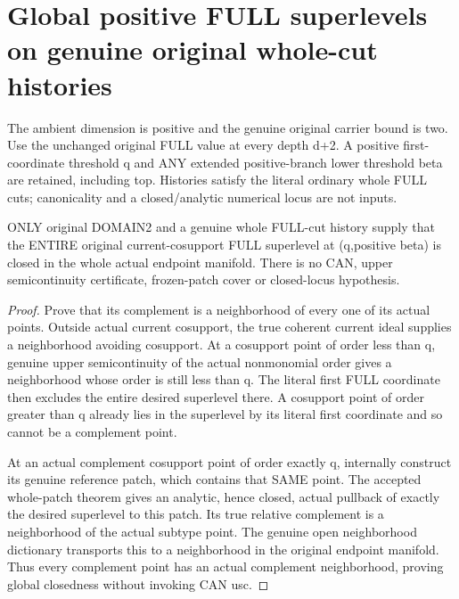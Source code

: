 \section{Global positive FULL superlevels on genuine original whole-cut histories}

The ambient dimension is positive and the genuine original carrier bound is
two. Use the unchanged original FULL value at every depth d+2. A positive
first-coordinate threshold q and ANY extended positive-branch lower threshold
beta are retained, including top. Histories satisfy the literal ordinary whole
FULL cuts; canonicality and a closed/analytic numerical locus are not inputs.

\begin{theorem}
\label{hir:original-full-cut-positive-global-superlevel-closed}
\leanok
ONLY original DOMAIN2 and a genuine whole FULL-cut history supply that the
ENTIRE original current-cosupport FULL superlevel at (q,positive beta) is
closed in the whole actual endpoint manifold. There is no CAN, upper
semicontinuity certificate, frozen-patch cover or closed-locus hypothesis.
\end{theorem}
\begin{proof}
Prove that its complement is a neighborhood of every one of its actual
points. Outside actual current cosupport, the true coherent current ideal
supplies a neighborhood avoiding cosupport. At a cosupport point of order
less than q, genuine upper semicontinuity of the actual nonmonomial order
gives a neighborhood whose order is still less than q. The literal first
FULL coordinate then excludes the entire desired superlevel there. A
cosupport point of order greater than q already lies in the superlevel by
its literal first coordinate and so cannot be a complement point.

At an actual complement cosupport point of order exactly q, internally
construct its genuine reference patch, which contains that SAME point.
The accepted whole-patch theorem gives an analytic, hence closed, actual
pullback of exactly the desired superlevel to this patch. Its true relative
complement is a neighborhood of the actual subtype point. The genuine open
neighborhood dictionary transports this to a neighborhood in the original
endpoint manifold. Thus every complement point has an actual complement
neighborhood, proving global closedness without invoking CAN usc.
\end{proof}

